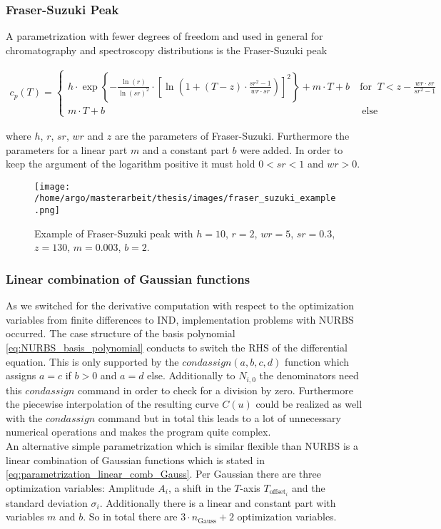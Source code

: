 \documentclass{scrartcl}[12pt, halfparskip]
\numberwithin{equation}{section}
\numberwithin{figure}{section}
\numberwithin{table}{section}
\begin{document}
\subsubsection{Fraser-Suzuki Peak}
A parametrization with fewer degrees of freedom and used in general for chromatography and spectroscopy distributions is the Fraser-Suzuki peak \cite{fraser_suzuki_1} \cite{fraser_suzuki_many_fcts}

\begin{align}
	c_p(T) =
	\begin{cases}
		h \cdot \exp \left\{ - \frac{\ln(r)}{\ln(sr)^2} \cdot \left[ \ln\left( 1 + (T-z) \cdot \frac{sr^2 - 1}{wr \cdot sr} \right) \right]^2 \right\} + m \cdot T + b \ & \text{for } \ T < z - \frac{wr \cdot sr}{sr^2 - 1} \\
		m \cdot T + b \ & \ \text{else}
	\end{cases}
	\label{eq:fraser_suzuki}
\end{align}

where $h$, $r$, $sr$, $wr$ and $z$ are the parameters of Fraser-Suzuki. Furthermore the parameters for a linear part $m$ and a constant part $b$ were added. In order to keep the argument of the logarithm positive it must hold $0 < sr < 1$ and $wr > 0$.

\begin{figure}[H]
	\centering
	\texttt{[image: /home/argo/masterarbeit/thesis/images/fraser\_suzuki\_example.png]}
	\caption{Example of Fraser-Suzuki peak with $h=10$, $r=2$, $wr=5$, $sr=0.3$, $z=130$, $m=0.003$, $b=2$.}
	\label{fig:parametrization_example_fraser_suzuki}
\end{figure}



\subsubsection{Linear combination of Gaussian functions}
As we switched for the derivative computation with respect to the optimization variables from finite differences to IND, implementation problems with NURBS occurred. 
The case structure of the basis polynomial \eqref{eq:NURBS_basis_polynomial} conducts to switch the RHS of the differential equation. This is only supported by the $condassign(a,b,c,d)$ function which assigns $a=c$ if $b>0$ and $a=d$ else. Additionally to $N_{i,0}$ the denominators need this $condassign$ command in order to check for a division by zero. 
Furthermore the piecewise interpolation of the resulting curve $C(u)$ could be realized as well with the $condassign$ command but in total this leads to a lot of unnecessary numerical operations and makes the program quite complex. \\
An alternative simple parametrization which is similar flexible than NURBS is a linear combination of Gaussian functions which is stated in \eqref{eq:parametrization_linear_comb_Gauss}. Per Gaussian there are three optimization variables: Amplitude $A_i$, a shift in the $T$-axis $T_{\text{offset}_i}$ and the standard deviation $\sigma_i$. Additionally there is a linear and constant part with variables $m$ and $b$. So in total there are $3 \cdot n_{\text{Gauss}} + 2$ optimization variables. \\
\end{document}
